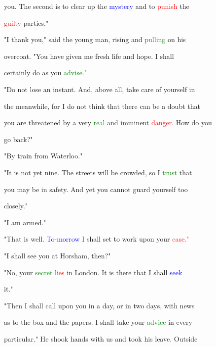  you. The second is to clear up the \textcolor{blue}{mystery} and to \textcolor{red}{punish} the

 \textcolor{red}{guilty} parties."



 "I thank you," said the \textcolor{BurntOrange}{young} man, rising and \textcolor{green}{pulling} on his

 overcoat. "You have given me fresh life and \textcolor{BurntOrange}{hope.} I shall

 certainly do as you \textcolor{green}{advise."}



 "Do not \textcolor{BurntOrange}{lose} an instant. And, above all, take care of yourself in

 the meanwhile, for I do not think that there can be a \textcolor{BurntOrange}{doubt} that

 you are \textcolor{BurntOrange}{threatened} by a very \textcolor{green}{real} and \textcolor{BurntOrange}{imminent} \textcolor{red}{danger.} How do you

 go back?"



 "By train from Waterloo."



 "It is not yet nine. The streets will be crowded, so I \textcolor{green}{trust} that

 you may be in safety. And yet you cannot \textcolor{BurntOrange}{guard} yourself too

 closely."



 "I am armed."



 "That is well. \textcolor{blue}{To-morrow} I shall set to work upon your \textcolor{red}{case."}



 "I shall see you at Horsham, then?"



 "No, your \textcolor{green}{secret} \textcolor{red}{lies} in London. It is there that I shall \textcolor{blue}{seek}

 it."



 "Then I shall call upon you in a day, or in two days, with news

 as to the box and the papers. I shall take your \textcolor{green}{advice} in every

 particular." He shook hands with us and took his \textcolor{BurntOrange}{leave.} Outside

